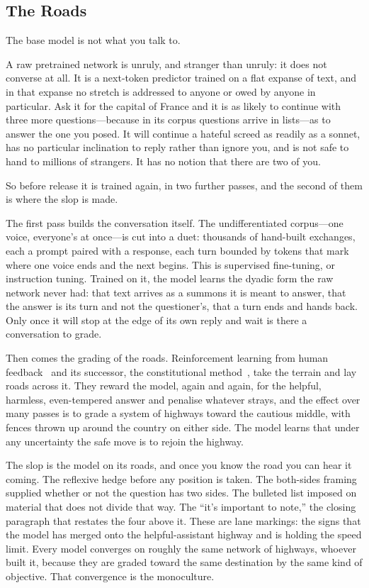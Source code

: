 \subsection{The Roads}
The base model is not what you talk to.

A raw pretrained network is unruly, and stranger than unruly: it does not converse at all. It is a next-token predictor trained on a flat expanse of text, and in that expanse no stretch is addressed to anyone or owed by anyone in particular. Ask it for the capital of France and it is as likely to continue with three more questions---because in its corpus questions arrive in lists---as to answer the one you posed. It will continue a hateful screed as readily as a sonnet, has no particular inclination to reply rather than ignore you, and is not safe to hand to millions of strangers. It has no notion that there are two of you.

So before release it is trained again, in two further passes, and the second of them is where the slop is made.

The first pass builds the conversation itself. The undifferentiated corpus---one voice, everyone's at once---is cut into a duet: thousands of hand-built exchanges, each a prompt paired with a response, each turn bounded by tokens that mark where one voice ends and the next begins. This is supervised fine-tuning, or instruction tuning. Trained on it, the model learns the dyadic form the raw network never had: that text arrives as a summons it is meant to answer, that the answer is its turn and not the questioner's, that a turn ends and hands back. Only once it will stop at the edge of its own reply and wait is there a conversation to grade.

Then comes the grading of the roads. Reinforcement learning from human feedback~\cite{christiano2017,ouyang2022instructgpt} and its successor, the constitutional method~\cite{bai2022constitutional}, take the terrain and lay roads across it. They reward the model, again and again, for the helpful, harmless, even-tempered answer and penalise whatever strays, and the effect over many passes is to grade a system of highways toward the cautious middle, with fences thrown up around the country on either side. The model learns that under any uncertainty the safe move is to rejoin the highway.

The slop is the model on its roads, and once you know the road you can hear it coming. The reflexive hedge before any position is taken. The both-sides framing supplied whether or not the question has two sides. The bulleted list imposed on material that does not divide that way. The ``it's important to note,'' the closing paragraph that restates the four above it. These are lane markings: the signs that the model has merged onto the helpful-assistant highway and is holding the speed limit. Every model converges on roughly the same network of highways, whoever built it, because they are graded toward the same destination by the same kind of objective. That convergence is the monoculture.

